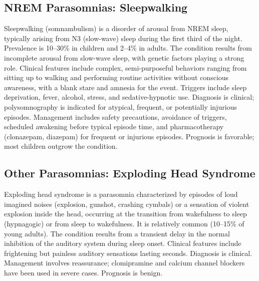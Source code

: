 \subsection{NREM Parasomnias: Sleepwalking}
\label{sec:Sleepwalking}
Sleepwalking (somnambulism) is a disorder of arousal from NREM sleep, typically arising from N3 (slow-wave) sleep during the first third of the night. Prevalence is 10--30\% in children and 2--4\% in adults. The condition results from incomplete arousal from slow-wave sleep, with genetic factors playing a strong role. Clinical features include complex, semi-purposeful behaviors ranging from sitting up to walking and performing routine activities without conscious awareness, with a blank stare and amnesia for the event. Triggers include sleep deprivation, fever, alcohol, stress, and sedative-hypnotic use. Diagnosis is clinical; polysomnography is indicated for atypical, frequent, or potentially injurious episodes. Management includes safety precautions, avoidance of triggers, scheduled awakening before typical episode time, and pharmacotherapy (clonazepam, diazepam) for frequent or injurious episodes. Prognosis is favorable; most children outgrow the condition.

\subsection{Other Parasomnias: Exploding Head Syndrome}
\label{sec:Exploding Head Syndrome}
Exploding head syndrome is a parasomnia characterized by episodes of loud imagined noises (explosion, gunshot, crashing cymbals) or a sensation of violent explosion inside the head, occurring at the transition from wakefulness to sleep (hypnagogic) or from sleep to wakefulness. It is relatively common (10--15\% of young adults). The condition results from a transient delay in the normal inhibition of the auditory system during sleep onset. Clinical features include frightening but painless auditory sensations lasting seconds. Diagnosis is clinical. Management involves reassurance; clomipramine and calcium channel blockers have been used in severe cases. Prognosis is benign.

